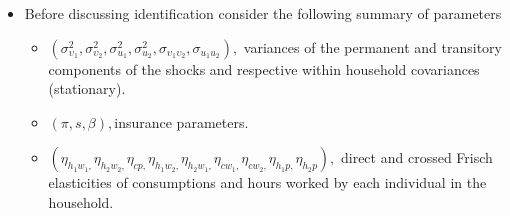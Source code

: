 \documentclass[notes=show]{beamer}
\begin{document}
\begin{frame}%



\begin{itemize}
\item Before discussing identification consider the following summary of
parameters

\begin{itemize}
\item $\left( \sigma _{\upsilon _{1}}^{2},\sigma _{\upsilon _{2}}^{2},\sigma
_{u_{1}}^{2},\sigma _{u_{2}}^{2},\sigma _{\upsilon _{1}\upsilon _{2}},\sigma
_{u_{1}u_{2}}\right) ,$ variances of the permanent and transitory components
of the shocks and respective within household covariances (stationary). 

\item  $\left( \pi ,s,\beta \right) ,$insurance parameters. 

\item $\left( \eta _{h_{1}w_{1},}\eta _{h_{2}w_{2},}\eta _{cp,}\eta
_{h_{1}w_{2},}\eta _{h_{2}w_{1},}\eta _{cw_{1},}\eta _{cw_{2},}\eta
_{h_{1}p,}\eta _{h_{2}p}\right) ,$ direct and crossed Frisch elasticities of
consumptions and hours worked by each individual in the household. 
\end{itemize}
\end{itemize}

\transboxout%
\end{frame}%

\bigskip 
\end{document}
